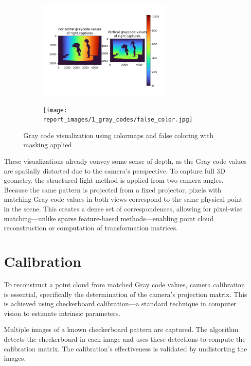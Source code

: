 \documentclass{report}
\begin{document}
\begin{figure}[H]
    \centering
    \begin{subfigure}[b]{0.45\linewidth}
        \centering
        \includegraphics[height=50mm, keepaspectratio]{report_images/1_gray_codes/colormapped.png}
    \end{subfigure}
    \hfill
    \begin{subfigure}[b]{0.45\linewidth}
        \centering
        \texttt{[image: report\_images/1\_gray\_codes/false\_color.jpg]}
    \end{subfigure}
    \caption{Gray code visualization using colormaps and false coloring with masking applied}
    \label{fig:graycodes_visualised}
\end{figure}

These visualizations already convey some sense of depth, as the Gray code values are spatially distorted due to the camera's perspective. To capture full 3D geometry, the structured light method is applied from two camera angles. Because the same pattern is projected from a fixed projector, pixels with matching Gray code values in both views correspond to the same physical point in the scene. This creates a dense set of correspondences, allowing for pixel-wise matching—unlike sparse feature-based methods—enabling point cloud reconstruction or computation of transformation matrices.

\section{Calibration}

To reconstruct a point cloud from matched Gray code values, camera calibration is essential, specifically the determination of the camera’s projection matrix. This is achieved using checkerboard calibration—a standard technique in computer vision to estimate intrinsic parameters.

Multiple images of a known checkerboard pattern are captured. The algorithm detects the checkerboard in each image and uses these detections to compute the calibration matrix. The calibration’s effectiveness is validated by undistorting the images.
\end{document}
